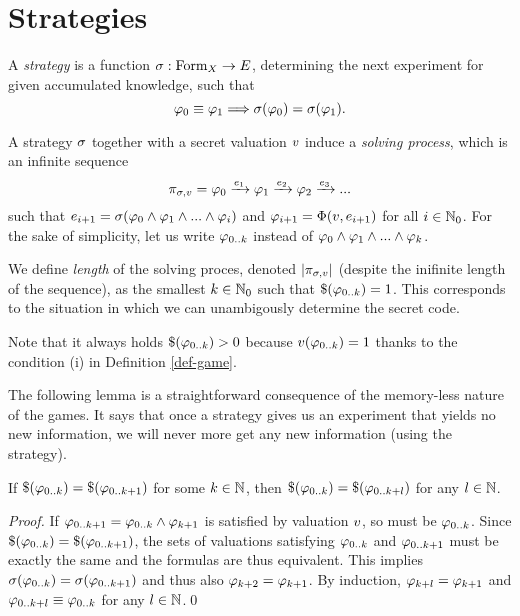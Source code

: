 \section{Strategies}

\begin{definition}
A \emph{strategy} is a function $\sigma: \textrm{Form}_X -> E$,
determining the next experiment for given accumulated knowledge,
such that
\[
\varphi_0 \equiv \varphi_1 ==> \sigma(\varphi_0) = \sigma(\varphi_1).
\]
\end{definition}

A strategy $\sigma$ together with a secret valuation $v$ induce
  a \emph{solving process}, which is an infinite sequence
\[
\pi_{\sigma,v} = \varphi_0 \xrightarrow{e_1} \varphi_1 \xrightarrow{e_2}
  \varphi_2 \xrightarrow{e_3} ...
\]
such that
$e_{i+1} = \sigma(\varphi_0 \wedge \varphi_1 \wedge ... \wedge \varphi_i)$ and
$\varphi_{i+1} = \Phi(v, e_{i+1})$ for all $i\in\mathbb{N}_0$.
For the sake of simplicity, let us write $\varphi_{0..k}$
instead of $\varphi_0 \wedge \varphi_1 \wedge ... \wedge \varphi_k$.

We define \emph{length} of the solving proces,
  denoted $|\pi_{\sigma,v}|$
  (despite the inifinite length of the sequence),
  as the smallest $k\in\mathbb{N}_0$ such that
  $\$(\varphi_{0..k}) = 1$.
This corresponds to the situation in which we can unambigously
  determine the secret code.

Note that it always holds $\$(\varphi_{0..k}) > 0$ because
  $v(\varphi_{0..k}) = 1$ thanks to the condition (i)
  in Definition \ref{def-game}.

The following lemma is a straightforward consequence
  of the memory-less nature of the games. It says that once a strategy
  gives us an experiment that yields no new information, we will never more get
  any new information (using the strategy).

\begin{lemma}
If $\$(\varphi_{0..k}) = \$(\varphi_{0..k+1})$ for some $k\in\mathbb{N}$,
then $\$(\varphi_{0..k}) = \$(\varphi_{0..k+l})$ for any $l\in\mathbb{N}$.
\end{lemma}

\begin{proof}
If $\varphi_{0..k+1} = \varphi_{0..k} \wedge \varphi_{k+1}$
is satisfied by valuation $v$, so must be $\varphi_{0..k}$.
Since $\$(\varphi_{0..k}) = \$(\varphi_{0..k+1})$, the sets of
valuations satisfying $\varphi_{0..k}$ and $\varphi_{0..k+1}$ must be exactly the same
and the formulas are thus equivalent. This implies
$\sigma(\varphi_{0..k}) = \sigma(\varphi_{0..k+1})$ and thus also $\varphi_{k+2} = \varphi_{k+1}$.
By induction, $\varphi_{k+l} = \varphi_{k+1}$ and $\varphi_{0..k+l} \equiv \varphi_{0..k}$
 for any $l\in\mathbb{N}$.\qed
\end{proof}

